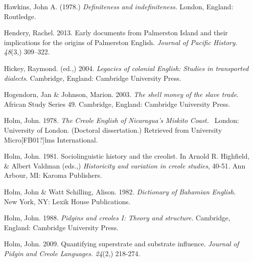 \begin{styleStandard}
Hawkins, John A. (1978.) \textit{Definiteness and indefiniteness. }London, England: Routledge. 
\end{styleStandard}

\begin{styleStandard}
Hendery, Rachel. 2013. Early documents from Palmerston Island and their implications for the origins of Palmerston English. \textit{Journal of Pacific History}. \textit{48}(3,) 309–322. 
\end{styleStandard}

\begin{styleStandard}
Hickey, Raymond. (ed.,) 2004. \textit{Legacies of colonial English: Studies in transported dialects}. Cambridge, England: Cambridge University Press.
\end{styleStandard}

\begin{styleStandard}
Hogendorn, Jan \& Johnson, Marion. 2003. \textit{The shell money of the slave trade}. African Study Series 49. Cambridge, England: Cambridge University Press. 
\end{styleStandard}

\begin{styleStandard}
Holm, John. 1978. \textit{The Creole English of Nicaragua’s Miskito Coast. }\ London: University of London. (Doctoral dissertation.) Retrieved from University Micro[FB01?]lms International.
\end{styleStandard}

\begin{styleStandard}
Holm, John. 1981. Sociolinguistic history and the creolist. In Arnold R. Highfield, \& Albert Valdman (eds.,) \textit{Historicity and variation in creole studies}, 40-51\textit{.} Ann Arbour, MI: Karoma Publishers.
\end{styleStandard}

\begin{styleStandard}
Holm, John \& Watt Schilling, Alison. 1982. \textit{Dictionary of Bahamian English}. New York, NY: Lexik House Publications.
\end{styleStandard}

\begin{styleStandard}
Holm, John. 1988. \textit{Pidgins and creoles I: Theory and structure. }Cambridge, England: Cambridge University Press.
\end{styleStandard}

\begin{styleStandard}
Holm, John. 2009. Quantifying superstrate and substrate influence. \textit{Journal of Pidgin and Creole Languages. 24}(2,) 218-274.
\end{styleStandard}


